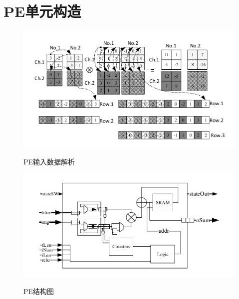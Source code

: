 
\section{PE单元构造}
\begin{figure}[h]
    \centering
    \includegraphics[scale=0.8]{../pdf/data.pdf}\\
    \caption{PE输入数据解析}
    \label{pe_data}
\end{figure}
\begin{figure}[h]
    \centering
    \includegraphics{../pdf/PE.pdf}\\
    \caption{PE结构图}
\end{figure}
